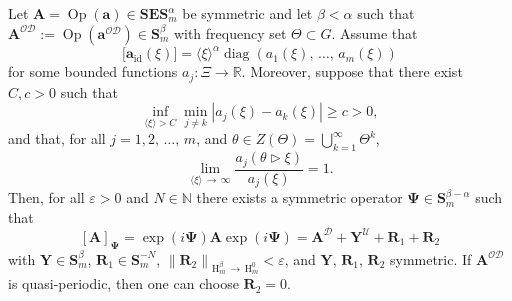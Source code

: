 \documentclass[AHL,Unicode,longabstracts,published]{cedram}
\DeclareMathOperator{\diag}{diag}
\DeclareMathOperator{\Op}{Op}
\DeclareMathOperator{\id}{id}
\renewcommand{\mathsf}{\mathrm}
\newcommand{\sfH}{\mathsf{H}}
\newcommand{\R}{\mathbb R}
\newcommand{\N}{\mathbb N}
\newcommand{\CD}{\mathcal{D}}
\newcommand{\CO}{\mathcal{O}}
\newcommand{\CU}{\mathcal{U}}
\newcommand{\COD}{{\CO\CD}}
\newcommand{\BPsi}{\boldsymbol \Psi}
\newcommand{\ba}{\mathbf a}
\newcommand{\BA}{\mathbf A}
\newcommand{\BE}{\mathbf E}
\newcommand{\BS}{\mathbf S}
\newcommand{\BR}{\mathbf R}
\newcommand{\BY}{\mathbf Y}
\renewcommand{\epsilon}{\varepsilon}
\newcommand{\act}{\triangleright}
\newcommand{\norm}[1]{\left\| #1 \right\|}
\newcommand{\ang}[1]{\langle #1 \rangle}
\begin{document}
\begin{theo}\label{thm:gtsystem}
Let $\BA = \Op(\ba) \in \BS\BE\BS_{m}^\alpha$ be symmetric and let $\beta<\alpha$ such that $\BA^{\CO\CD}:=\Op(\ba^{\COD}) \in
\BS^\beta_m$ with frequency set $\Theta \subset G$. Assume that
\begin{equation}
\big[\ba_{\id}(\xi)\big]=\ang{\xi}^\alpha\diag(a_1(\xi),\,\dotsc,\,a_m(\xi))
\end{equation}
for some bounded functions $a_j:\Xi\to\R$. Moreover, suppose that there exist $C, c>0$ such that
\begin{equation}\label{eq:ajboundfrombelowbis}
\inf\limits_{\ang \xi >C}\min\limits_{j\neq k} |a_j(\xi)-a_k(\xi)|\geq c>0,
\end{equation}
and that, for all $j=1,2,\,\dots,\,m$, and $\theta\in Z(\Theta)=\bigcup\limits_{k=1}^\infty \Theta^k$,
\begin{equation}\label{eq:shiftsatinfinity}
\lim\limits_{\ang{\xi}\,\to\,\infty} \frac{a_j(\theta\act\xi)}{a_j(\xi)}=1.
\end{equation}
Then, for all $\epsilon>0$ and $N \in \N$ there exists a symmetric operator $\BPsi\in\BS^{\beta-\alpha}_m$ such that
\begin{equation}\label{eq:matgt}
[\BA]_{\BPsi} = \exp(i \BPsi) \BA \exp(i\BPsi) = \BA^{\CD} + \BY^{\CU} +
\BR_1 + \BR_2
\end{equation}
with $\BY\in\BS^\beta_m$, $\BR_1 \in \BS_m^{-N}$, $\norm{\BR_2}_{\sfH_m^{\beta}\,\to\,\sfH_m^{0}} < \epsilon$, and $\BY$, $\BR_1$, $\BR_2$ symmetric. If $\BA^{\COD}$ is quasi-periodic, then one can choose $\BR_2=0$.
\end{theo}
\end{document}
